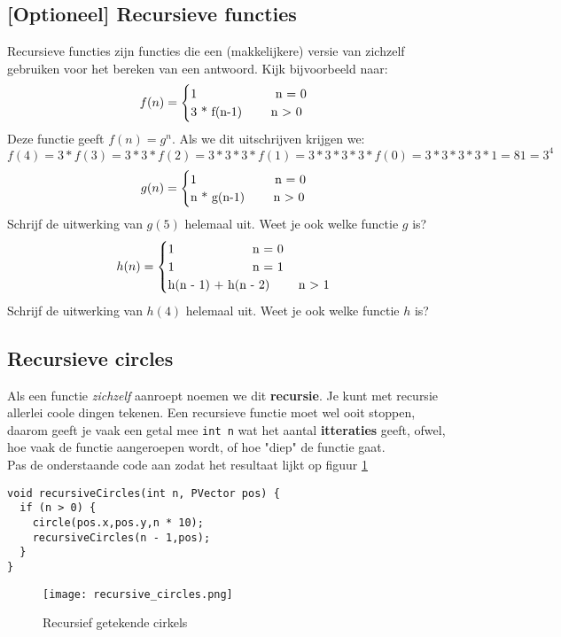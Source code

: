 \documentclass[../syllabus.tex]{subfiles}
\begin{document}
\subsection{[Optioneel] Recursieve functies}
Recursieve functies zijn functies die een (makkelijkere) versie van zichzelf gebruiken voor het bereken van een antwoord. Kijk bijvoorbeeld naar:
\[f(n) = \begin{cases}
        $1 \qquad\qquad\qquad n = 0$\\
        $3 * f(n-1)  \qquad n $>$ 0$
    \end{cases}
   \]
Deze functie geeft $f(n) = g^n$. Als we dit uitschrijven krijgen we: $f(4) = 3 * f(3) = 3 * 3 * f(2) = 3 * 3 * 3 * f(1) = 3 * 3 * 3 * 3 * f(0) = 3 * 3 * 3 * 3 * 1 = 81 = 3^4$
\[g(n) = \begin{cases}
        $1 \qquad\qquad\qquad n = 0$\\
        $n * g(n-1)  \qquad n $>$ 0$
    \end{cases}
   \]
Schrijf de uitwerking van $g(5)$ helemaal uit. Weet je ook welke functie $g$ is?
\[h(n) = \begin{cases}
        $1 \qquad\qquad\qquad n = 0$\\
        $1 \qquad\qquad\qquad n = 1$\\
        $h(n - 1) + h(n - 2)  \qquad n $>$ 1$
    \end{cases}
   \]
Schrijf de uitwerking van $h(4)$ helemaal uit. Weet je ook welke functie $h$ is?

\subsection{Recursieve circles}
Als een functie \textit{zichzelf} aanroept noemen we dit \textbf{recursie}. 
Je kunt met recursie allerlei coole dingen tekenen. Een recursieve functie moet wel ooit stoppen, daarom geeft je vaak een getal mee \texttt{int n} wat het aantal \textbf{itteraties} geeft, ofwel, hoe vaak de functie aangeroepen wordt, of hoe "diep" de functie gaat.\\
Pas de onderstaande code aan zodat het resultaat lijkt op figuur \ref{fig:recursive_circles}
\begin{lstlisting}
void recursiveCircles(int n, PVector pos) {
  if (n > 0) { 
    circle(pos.x,pos.y,n * 10);
    recursiveCircles(n - 1,pos);
  }
}
\end{lstlisting}
\begin{figure}[H]
	\centering
	\texttt{[image: recursive\_circles.png]}
	\caption{Recursief getekende cirkels}
	\label{fig:recursive_circles}
\end{figure}
\end{document}
